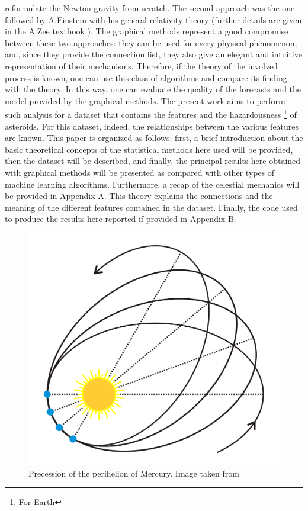 \documentclass[12pt,%
               a4paper,%
               oneside,openany,%
               titlepage,%
               headinclude,footinclude,%
               BCOR5mm,%
               cleardoublepage=empty,%
               tablecaptionabove,%
               floatperchapter,
               ]{scrreprt}                 %
\begin{document}
reformulate the Newton gravity from scratch. The second approach was the one followed by A.Einstein with his general relativity theory (further details are given in the A.Zee textbook \cite{zee2013einstein}). The graphical methods represent a good compromise between these two approaches: they can be used for every physical phenomenon, and, since they provide the connection list, they also give an elegant and intuitive representation of their mechanisms. Therefore, if the theory of the involved process is known, one can use this class of algorithms and compare its finding with the theory. In this way, one can evaluate the quality of the forecasts and the model provided by the graphical methods. The present work aims to perform such analysis for a dataset that contains the features and the hazardousness \footnote{For Earth} of asteroids. For this dataset, indeed, the relationships between the various features are known. This paper is organized as follows: first, a brief introduction about the basic theoretical concepts of the statistical methods here used will be provided, then the dataset will be described, and finally, the principal results here obtained with graphical methods will be presented as compared with other types of machine learning algorithms. Furthermore, a recap of the celestial mechanics will be provided in Appendix A. This theory explains the connections and the meaning of the different features contained in the dataset. Finally, the code used to produce the results here reported if provided in Appendix B.




\begin{figure}[h]
\begin{center}
\includegraphics[width=1\textwidth]{Figures/Perihelion_precession2.png}
\caption{Precession of the perihelion of Mercury. Image taken from \cite{Perihelion_precession}}
\label{Perihelion_precession2}
\end{center}
\end{figure}
\end{document}
